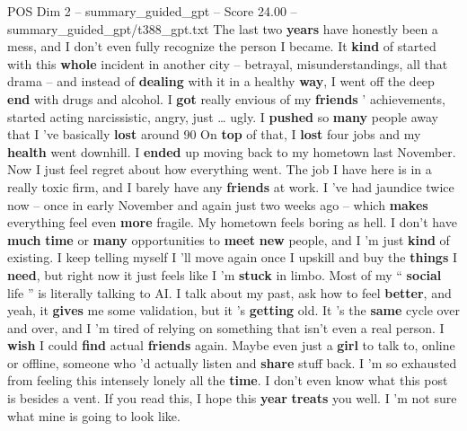 \begin{textsample}{POS Dim 2 – summary\_guided\_gpt – Score 24.00 – summary\_guided\_gpt/t388\_gpt.txt}  \label{ex:f2_pos_007}
The last two \textbf{years} have honestly been a mess, and I don't even fully recognize the person I became.
It \textbf{kind} of started with this \textbf{whole} incident in another city – betrayal, misunderstandings, all that drama – and instead of \textbf{dealing} with it in a healthy \textbf{way}, I went off the deep \textbf{end} with drugs and alcohol.
I \textbf{got} really envious of my \textbf{friends} ’ achievements, started acting narcissistic, angry, just … ugly.
I \textbf{pushed} so \textbf{many} people away that I ’ve basically \textbf{lost} around 90 %
On \textbf{top} of that, I \textbf{lost} four jobs and my \textbf{health} went downhill.
I \textbf{ended} up moving back to my hometown last November.
Now I just feel regret about how everything went.
The job I have here is in a really toxic firm, and I barely have any \textbf{friends} at work.
I ’ve had jaundice twice now – once in early November and again just two weeks ago – which \textbf{makes} everything feel even \textbf{more} fragile.
My hometown feels boring as hell.
I don't have \textbf{much} \textbf{time} or \textbf{many} opportunities to \textbf{meet} \textbf{new} people, and I ’m just \textbf{kind} of existing.
I keep telling myself I ’ll move again once I upskill and buy the \textbf{things} I \textbf{need}, but right now it just feels like I ’m \textbf{stuck} in limbo.
Most of my “ \textbf{social} life ” is literally talking to AI.
I talk about my past, ask how to feel \textbf{better}, and yeah, it \textbf{gives} me some validation, but it ’s \textbf{getting} old.
It ’s the \textbf{same} cycle over and over, and I ’m tired of relying on something that isn't even a real person.
I \textbf{wish} I could \textbf{find} actual \textbf{friends} again.
Maybe even just a \textbf{girl} to talk to, online or offline, someone who ’d actually listen and \textbf{share} stuff back.
I ’m so exhausted from feeling this intensely lonely all the \textbf{time}.
I don't even know what this post is besides a vent.
If you read this, I hope this \textbf{year} \textbf{treats} you well.
I ’m not sure what mine is going to look like.

\end{textsample}
